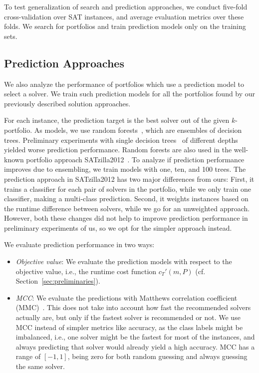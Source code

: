 \documentclass[conference]{IEEEtran}
\begin{document}
To test generalization of search and prediction approaches, we conduct five-fold cross-validation over SAT instances, and average evaluation metrics over these folds. 
We search for portfolios and train prediction models only on the training sets.

\subsection{Prediction Approaches}

We also analyze the performance of portfolios which use a prediction model to select a solver. 
We train such prediction models for all the portfolios found by our previously described solution approaches. 

For each instance, the prediction target is the best solver out of the given $k$-portfolio.
As models, we use random forests~\cite{breiman2001random}, which are ensembles of decision trees. 
Preliminary experiments with single decision trees~\cite{breiman1984classification} of different depths yielded worse prediction performance. 
Random forests are also used in the well-known portfolio approach SATzilla2012~\cite{xu2012satzilla2012}. 
To analyze if prediction performance improves due to ensembling, we train models with one, ten, and 100 trees.
The prediction approach in SATzilla2012 has two major differences from ours:
First, it trains a classifier for each pair of solvers in the portfolio, while we only train one classifier, making a multi-class prediction.
Second, it weights instances based on the runtime difference between solvers, while we go for an unweighted approach.
However, both these changes did not help to improve prediction performance in preliminary experiments of us, so we opt for the simpler approach instead.

We evaluate prediction performance in two ways:

\begin{itemize}
	\item \emph{Objective value}:
	We evaluate the prediction models with respect to the objective value, i.e., the runtime cost function $c_{T}'(m,P)$ (cf. Section~\ref{sec:preliminaries}). 
	\item \emph{MCC}:
	We evaluate the predictions with Matthews correlation coefficient (MMC)~\cite{matthews1975comparison, gorodkin2004comparing}.
	This does not take into account how fast the recommended solvers actually are, but only if the fastest solver is recommended or not.
	We use MCC instead of simpler metrics like accuracy, as the class labels might be imbalanced, i.e., one solver might be the fastest for most of the instances, and always predicting that solver would already yield a high accuracy.
	MCC has a range of $[-1,1]$, being zero for both random guessing and always guessing the same solver.
\end{itemize}
\end{document}
